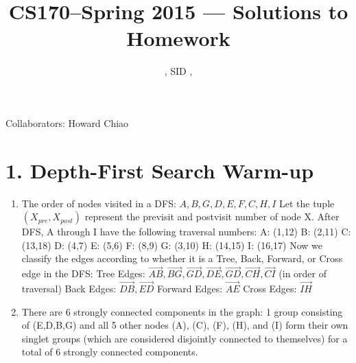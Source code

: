 \documentclass[11pt]{article}
\title{CS170--Spring 2015 --- Solutions to Homework \Homework}
\author{\Name, SID \SID, \texttt{\Login}}
\date{}
\newenvironment{qparts}{\begin{enumerate}[{(}a{)}]}{\end{enumerate}}
\begin{document}
\maketitle

Collaborators: Howard Chiao

\section*{1. Depth-First Search Warm-up}
\begin{qparts}                                               
          
\item The order of nodes visited in a DFS: $A, B, G, D, E, F, C, H, I$\newline
Let the tuple $(X_{pre}, X_{post})$ represent the previsit and postvisit number of node X. After DFS, A through I have the following traversal numbers:\newline
A: (1,12)\newline
B: (2,11)\newline
C: (13,18)\newline
D: (4,7)\newline
E: (5,6)\newline
F: (8,9)\newline
G: (3,10)\newline
H: (14,15)\newline
I: (16,17)\newline
Now we classify the edges according to whether it is a Tree, Back, Forward, or Cross edge in the DFS:\newline
Tree Edges: $\vec{AB}, \vec{BG}, \vec{GD}, 
\vec{DE}, \vec{GD}, \vec{CH}, \vec{CI}$ (in order of traversal)\newline
Back Edges: $\vec{DB}, \vec{ED}$\newline
Forward Edges: $\vec{AE}$\newline
Cross Edges: $\vec{IH}$\newline
\item There are 6 strongly connected components in the graph:
1 group consisting of (E,D,B,G) and all 5 other nodes (A), (C), (F), (H), and (I) form their own singlet groups (which are considered disjointly connected to themselves) for a total of 6 strongly connected components. 
\end{qparts}


\newpage
\end{document}
